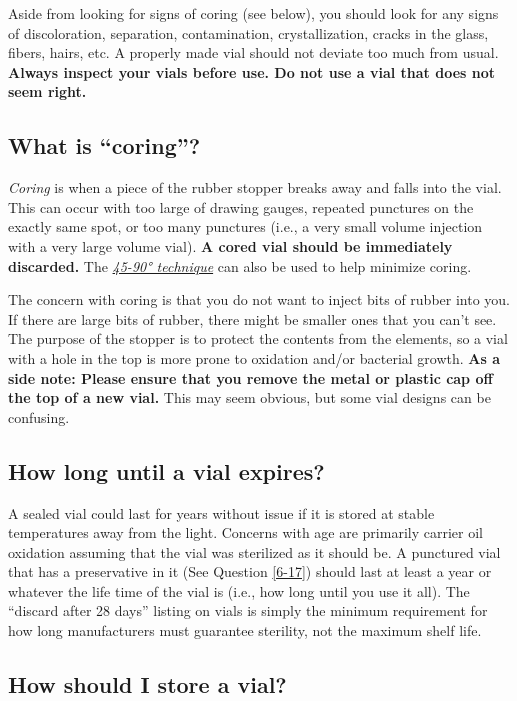 \documentclass{article}
\begin{document}
Aside from looking for signs of coring (see below), you should look for any signs of discoloration, separation, contamination, crystallization, cracks in the glass, fibers, hairs, etc. A properly made vial should not deviate too much from usual. \textbf{Always inspect your vials before use. Do not use a vial that does not seem right.}

\subsection{What is “coring”?}\label{5-23}

\textit{Coring} is when a piece of the rubber stopper breaks away and falls into the vial. This can occur with too large of drawing gauges, repeated punctures on the exactly same spot, or too many punctures (i.e., a very small volume injection with a very large volume vial). \textbf{A cored vial should be immediately discarded. }The \href{https://www.youtube.com/watch?v=w5F0SLoMjC8}{\textit{45-90° technique}} can also be used to help minimize coring.

The concern with coring is that you do not want to inject bits of rubber into you. If there are large bits of rubber, there might be smaller ones that you can't see. The purpose of the stopper is to protect the contents from the elements, so a vial with a hole in the top is more prone to oxidation and/or bacterial growth. \textbf{As a side note: Please ensure that you remove the metal or plastic cap off the top of a new vial. }This may seem obvious, but some vial designs can be confusing. 

\subsection{How long until a vial expires?}

A sealed vial could last for years without issue if it is stored at stable temperatures away from the light. Concerns with age are primarily carrier oil oxidation assuming that the vial was sterilized as it should be. A punctured vial that has a preservative in it (See Question \ref{6-17}) should last at least a year or whatever the life time of the vial is (i.e., how long until you use it all). The “discard after 28 days” listing on vials is simply the minimum requirement for how long manufacturers must guarantee sterility, not the maximum shelf life. 

\subsection{How should I store a vial?}
\end{document}
